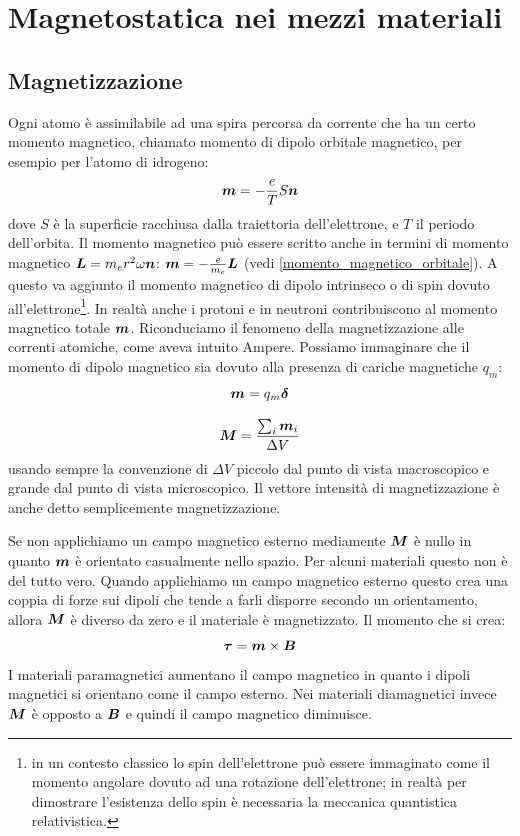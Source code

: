 \chapter{Magnetostatica nei mezzi materiali}
\minitoc
\section{Magnetizzazione}
Ogni atomo è assimilabile ad una spira percorsa da corrente che ha un certo momento magnetico, chiamato momento di dipolo orbitale magnetico, per esempio per l'atomo di idrogeno:
\[
  \boldsymbol{m}=-\frac{e}{T}S\boldsymbol{n}
\]
dove $S$ è la superficie racchiusa dalla traiettoria dell'elettrone, e $T$ il periodo dell'orbita. Il momento magnetico può essere scritto anche in termini di momento magnetico $\boldsymbol{L}=m_er^2 \omega\boldsymbol{n}$: $\boldsymbol{m}=-\frac{e}{m_e}\boldsymbol{L}$ (vedi \ref{momento_magnetico_orbitale}). A questo va aggiunto il momento magnetico di dipolo intrinseco o di spin dovuto all'elettrone\footnote{in un contesto classico lo spin dell'elettrone può essere immaginato come il momento angolare dovuto ad una rotazione dell'elettrone; in realtà per dimostrare l'esistenza dello spin è necessaria la meccanica quantistica relativistica.}. In realtà anche i protoni e in neutroni contribuiscono al momento magnetico totale $\boldsymbol{m}$. Riconduciamo il fenomeno della magnetizzazione alle correnti atomiche, come aveva intuito Ampere. Possiamo immaginare che il momento di dipolo magnetico sia dovuto alla presenza di cariche magnetiche $q_m$:
\begin{equation}
  \boldsymbol{m}=q_m\boldsymbol{\delta}
\end{equation}
\begin{Def}
  \begin{equation}
    \boldsymbol{M}=\frac{\sum_i\boldsymbol{m}_i}{\Delta V}
    \label{intensita_magnetizzazione}
  \end{equation}
  usando sempre la convenzione di $\Delta V$ piccolo dal punto di vista macroscopico e grande dal punto di vista microscopico. Il vettore intensità di magnetizzazione è anche detto semplicemente magnetizzazione.
\end{Def}
Se non applichiamo un campo magnetico esterno mediamente $\boldsymbol{M}$ è nullo in quanto $\boldsymbol{m}$ è orientato casualmente nello spazio. Per alcuni materiali questo non è del tutto vero. Quando applichiamo un campo magnetico esterno questo crea una coppia di forze sui dipoli che tende a farli disporre secondo un orientamento, allora $\boldsymbol{M}$ è diverso da zero e il materiale è magnetizzato. Il momento che si crea:
\[
  \boldsymbol{\tau}=\boldsymbol{m}\times\boldsymbol{B}
\]
I materiali paramagnetici aumentano il campo magnetico in quanto i dipoli magnetici si orientano come il campo esterno. Nei materiali diamagnetici invece $\boldsymbol{M}$ è opposto a $\boldsymbol{B}$ e quindi il campo magnetico diminuisce.

